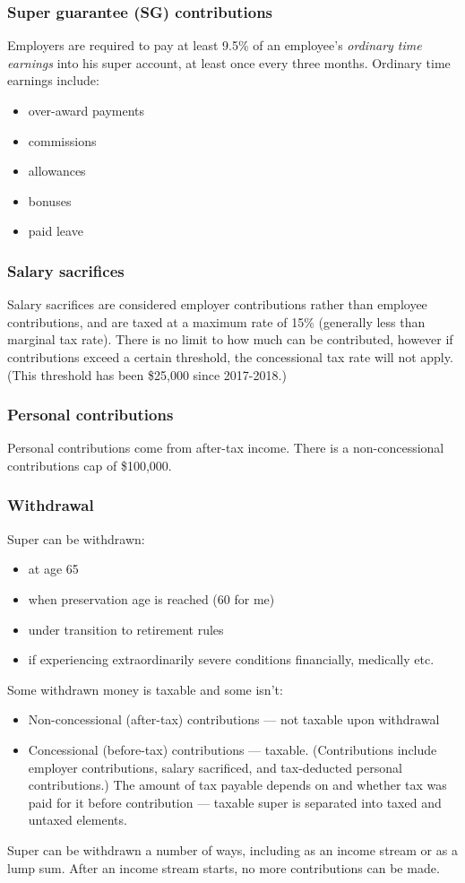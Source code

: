 \subsubsection{Super guarantee (SG) contributions}
Employers are required to pay at least 9.5\% of an employee's \textit{ordinary time earnings} into his super account, at least once every three months. Ordinary time earnings include:
\begin{itemize}
	\item over-award payments
	\item commissions
	\item allowances
	\item bonuses
	\item paid leave
\end{itemize}

\subsubsection{Salary sacrifices}
Salary sacrifices are considered employer contributions rather than employee contributions, and are taxed at a maximum rate of 15\% (generally less than marginal tax rate). There is no limit to how much can be contributed, however if contributions exceed a certain threshold, the concessional tax rate will not apply. (This threshold has been \$25,000 since 2017-2018.)

\subsubsection{Personal contributions}
Personal contributions come from after-tax income. There is a non-concessional contributions cap of \$100,000.

\subsubsection{Withdrawal}
Super can be withdrawn:
\begin{itemize}
	\item at age 65
	\item when preservation age is reached (60 for me)
	\item under transition to retirement rules
	\item if experiencing extraordinarily severe conditions financially, medically etc.
\end{itemize}
Some withdrawn money is taxable and some isn't:
\begin{itemize}
	\item Non-concessional (after-tax) contributions --- not taxable upon withdrawal
	\item Concessional (before-tax) contributions --- taxable. (Contributions include employer contributions, salary sacrificed, and tax-deducted personal contributions.) The amount of tax payable depends on and whether tax was paid for it before contribution --- taxable super is separated into taxed and untaxed elements.
\end{itemize}
Super can be withdrawn a number of ways, including as an income stream or as a lump sum. After an income stream starts, no more contributions can be made.

